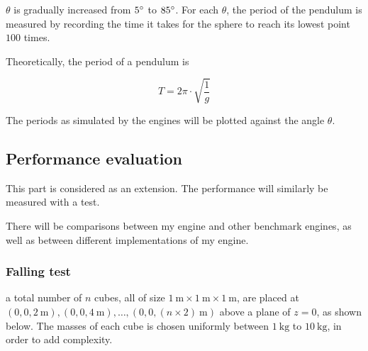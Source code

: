 \documentclass[12pt]{article}
\begin{document}
\begin{center}
  \end{center}

$\theta$ is gradually increased from $5\degree$ to $85\degree$.
For each $\theta$, 
the period of the pendulum is measured by recording the time it takes for the sphere to reach its lowest point $100$ times.

Theoretically, the period of a pendulum is

\begin{equation}
T = 2  \pi \cdot \sqrt{\frac{1}{g}}
\end{equation}

The periods as simulated by the engines will be plotted against the angle $\theta$.

\subsection{Performance evaluation}

This part is considered as an extension. The performance will similarly be measured with a test.

There will be comparisons between my engine and other benchmark engines, as well as between different implementations of my engine.

\subsubsection{Falling test}

a total number of $n$ cubes, all of size $\SI{1}{\m} \times \SI{1}{\m} \times \SI{1}{\m}$, 
are placed at $(0, 0, \SI{2}{\m}), (0, 0, \SI{4}{\m}), \ldots, (0, 0, (n \times 2)\SI{}{\m})$ above a plane of $z = 0$, 
as shown below.
The masses of each cube is chosen uniformly between $\SI{1}{\kg}$ to $\SI{10}{\kg}$, in order to add complexity.
\end{document}
